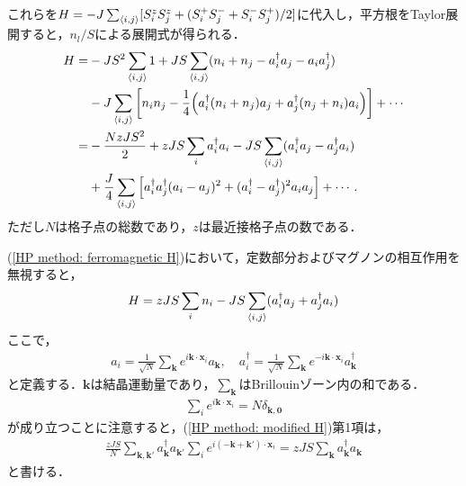 \documentclass[dvipdfmx,9pt]{beamer}
\numberwithin{equation}{section}
\begin{document}
\begin{frame}
    これらを$H = -J \sum_{\expval{i,j}} [S_i^z S_j^z + (S_i^+ S_j^- + S_i^- S_j^+)/2]$に代入し，平方根をTaylor展開すると，$n_l/S$による展開式が得られる．
    \begin{align}
        H = & -JS^2 \sum_{\expval{i,j}} 1
        + JS \sum_{\expval{i,j}} (n_i + n_j - a_i^\dagger a_j - a_i a_j^\dagger) \nonumber
        \\ &
        -J \sum_{\expval{i,j}} \qty[n_i n_j - \frac{1}{4}\qty(a_i^\dagger (n_i + n_j)a_j + a_j^\dagger(n_j + n_i)a_i)] + \cdots
        \\ 
        = & -\frac{NzJS^2}{2}
        +  zJS \sum_i a_i^\dagger a_i - JS \sum_{\expval{i,j}}(a_i^\dagger a_j - a_j^\dagger a_i)
        \nonumber
        \\ &
        +\frac{J}{4} \sum_{\expval{i,j}} \qty[a_i^\dagger a_j^\dagger(a_i - a_j)^2+(a_i^\dagger - a_j^\dagger)^2 a_i a_j] + \cdots.
        \label{HP method: ferromagnetic H}
    \end{align}
    ただし$N$は格子点の総数であり，$z$は最近接格子点の数である．
\end{frame}

\begin{frame}{}
    (\ref{HP method: ferromagnetic H})において，定数部分およびマグノンの相互作用を無視すると，
    \begin{align}
        H =  zJS \sum_i n_i - JS \sum_{\expval{i,j}}(a_i^\dagger a_j + a_j^\dagger a_i) 
        \label{HP method: modified H}
    \end{align}
    ここで，
    \begin{align}
        a_i = \frac{1}{\sqrt{N}}\sum_{\bm{k}} e^{i \bm{k} \cdot \bm{x}_i}a_{\bm{k}},
        \quad
        a_i^\dagger = \frac{1}{\sqrt{N}} \sum_{\bm{k}} e^{-i \bm{k}\cdot \bm{x}_i}a_{\bm{k}}^\dagger
    \end{align}
    と定義する．$\bm{k}$は結晶運動量であり，$\sum_{\bm{k}}$はBrillouinゾーン内の和である．
    \begin{align}
        \sum_{i} e^{i \bm{k}\cdot \bm{x}_i} = N \delta_{\bm{k}, \bm{0}}
    \end{align}
    が成り立つことに注意すると，(\ref{HP method: modified H})第1項は，
    \begin{align}
        \frac{zJS}{N} \sum_{\bm{k},\bm{k}'} a_{\bm{k}}^\dagger a_{\bm{k}'} \sum_i e^{i (-\bm{k}+\bm{k}')\cdot \bm{x}_i}
        = zJS \sum_{\bm{k}} a_{\bm{k}}^\dagger a_{\bm{k}}
    \end{align}
    と書ける．
\end{frame}
\end{document}
